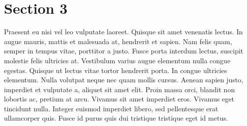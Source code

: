 \documentclass[letterpaper,11pt,twocolumn]{article}
\begin{document}
\section{Section 3}
Praesent eu nisi vel leo vulputate laoreet. Quisque sit amet venenatis lectus. In augue mauris, mattis et malesuada at, hendrerit et sapien. Nam felis quam, semper in tempus vitae, porttitor a justo. Fusce porta interdum lectus, suscipit molestie felis ultricies at. Vestibulum varius augue elementum nulla congue egestas. Quisque ut lectus vitae tortor hendrerit porta. In congue ultricies elementum. Nulla volutpat neque nec quam mollis cursus. Aenean sapien justo, imperdiet et vulputate a, aliquet sit amet elit. Proin massa orci, blandit non lobortis ac, pretium at arcu. Vivamus sit amet imperdiet eros. Vivamus eget tincidunt nulla. Integer euismod imperdiet libero, sed pellentesque erat ullamcorper quis. Fusce id purus quis dui tristique tristique eget id metus.
\end{document}
